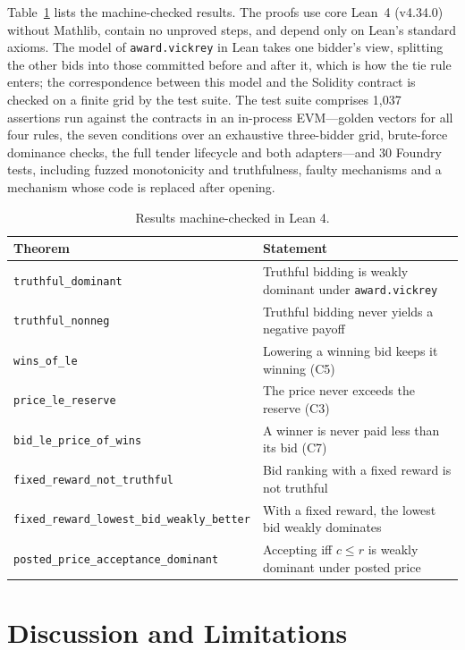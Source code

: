 \documentclass[11pt]{article}
\theoremstyle{definition}
\theoremstyle{remark}
\newcommand{\code}[1]{\texttt{#1}}
\begin{document}
Table~\ref{tab:lean} lists the machine-checked results. The proofs use core Lean~4 (v4.34.0) without Mathlib, contain no unproved steps, and depend only on Lean's standard axioms. The model of \code{award.vickrey} in Lean takes one bidder's view, splitting the other bids into those committed before and after it, which is how the tie rule enters; the correspondence between this model and the Solidity contract is checked on a finite grid by the test suite. The test suite comprises 1,037 assertions run against the contracts in an in-process EVM---golden vectors for all four rules, the seven conditions over an exhaustive three-bidder grid, brute-force dominance checks, the full tender lifecycle and both adapters---and 30 Foundry tests, including fuzzed monotonicity and truthfulness, faulty mechanisms and a mechanism whose code is replaced after opening.

\begin{table}[t]
\centering
\small
\begin{tabular}{@{}ll@{}}
\toprule
Theorem & Statement \\
\midrule
\code{truthful\_dominant} & Truthful bidding is weakly dominant under \code{award.vickrey} \\
\code{truthful\_nonneg} & Truthful bidding never yields a negative payoff \\
\code{wins\_of\_le} & Lowering a winning bid keeps it winning (C5) \\
\code{price\_le\_reserve} & The price never exceeds the reserve (C3) \\
\code{bid\_le\_price\_of\_wins} & A winner is never paid less than its bid (C7) \\
\code{fixed\_reward\_not\_truthful} & Bid ranking with a fixed reward is not truthful \\
\code{fixed\_reward\_lowest\_bid\_weakly\_better} & With a fixed reward, the lowest bid weakly dominates \\
\code{posted\_price\_acceptance\_dominant} & Accepting iff $c \le r$ is weakly dominant under posted price \\
\bottomrule
\end{tabular}
\caption{Results machine-checked in Lean 4.}
\label{tab:lean}
\end{table}

\section{Discussion and Limitations}
\end{document}
